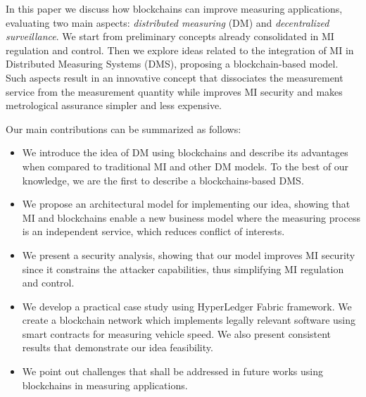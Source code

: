 \documentclass[journal]{IEEEtran}
\begin{document}
In this paper we discuss how blockchains can improve measuring applications, evaluating two main aspects: \emph{distributed measuring} (DM) and \emph{decentralized surveillance}. We start from preliminary concepts already consolidated in MI regulation and control. Then we explore ideas related to the integration of MI in Distributed Measuring Systems (DMS), proposing a blockchain-based model. Such aspects result in an innovative concept that dissociates the measurement service from the measurement quantity while improves MI security and makes metrological assurance simpler and less expensive. %

Our main contributions can be summarized as follows:
\begin{itemize}
 \item We introduce the idea of DM using blockchains and describe its advantages when compared to traditional MI and other DM models. To the best of our knowledge, we are the first to describe a blockchains-based DMS.
 \item We propose an architectural model for implementing our idea, showing that MI and blockchains enable a new business model where the measuring process is an independent service, which reduces conflict of interests.
 \item We present a security analysis, showing that our model improves MI security since it constrains the attacker capabilities, thus simplifying MI regulation and control.
 \item We develop a practical case study using HyperLedger Fabric framework. We create a blockchain network which implements legally relevant software using smart contracts for measuring vehicle speed. We also present consistent results that demonstrate our idea feasibility.
 \item We point out challenges that shall be addressed in future works using blockchains in measuring applications.
\end{itemize}

\end{document}
